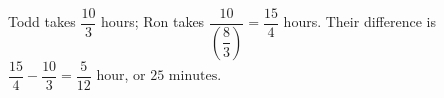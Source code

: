 Todd takes $\dfrac{10}{3}$ hours; Ron takes $\dfrac{10}{(\dfrac{8}{3})}=\dfrac{15}{4}$ hours. Their difference is $\dfrac{15}{4}-\dfrac{10}{3}=\dfrac{5}{12}$ hour, or $\boxed{25\text{ minutes}}$.
